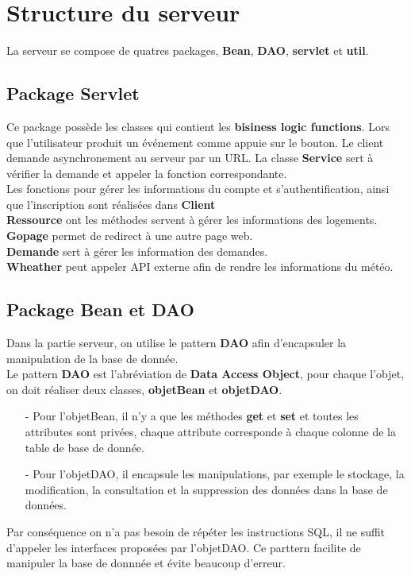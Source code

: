 \documentclass[14px]{article}
\begin{document}
\section{Structure du serveur}
La serveur se compose de quatres packages, \textbf{Bean}, \textbf{DAO}, \textbf{servlet} et \textbf{util}.

\subsection{Package Servlet}
Ce package possède les classes qui contient les \textbf{bisiness logic functions}.
Lors que l'utilisateur produit un événement comme appuie sur le bouton. Le client demande asynchronement au serveur par un URL. La classe \textbf{Service} sert à vérifier la demande et appeler la fonction correspondante.\\
Les fonctions pour gérer les informations du compte et s'authentification, ainsi que l'inscription sont réalisées dans \textbf{Client}\\
\textbf{Ressource} ont les méthodes servent à gérer les informations des logements.\\
\textbf{Gopage} permet de redirect à une autre page web.\\
\textbf{Demande} sert à gérer les information des demandes.\\
\textbf{Wheather} peut appeler API externe afin de rendre les informations du météo.

\subsection{Package Bean et DAO}
Dans la partie serveur, on utilise le pattern \textbf{DAO} afin d'encapsuler la manipulation de la base de donnée. \\
Le pattern \textbf{DAO} est l'abréviation de \textbf{Data Access Object}, pour chaque l'objet, on doit réaliser deux classes, \textbf{objetBean} et \textbf{objetDAO}.
\begin{enumerate}
	\item[-] Pour l'objetBean, il n'y a que les méthodes \textbf{get} et \textbf{set} et toutes les attributes sont privées, chaque attribute corresponde à chaque colonne de la table de base de donnée.
	\item[-] Pour l'objetDAO, il encapsule les manipulations, par exemple le stockage, la modification, la consultation et la suppression des données dans la base de données.
\end{enumerate}
Par conséquence on n'a pas besoin de répéter les instructions SQL, il ne suffit d'appeler les interfaces proposées par l'objetDAO. Ce parttern facilite de manipuler la base de donnnée et évite beaucoup d'erreur.
\end{document}
